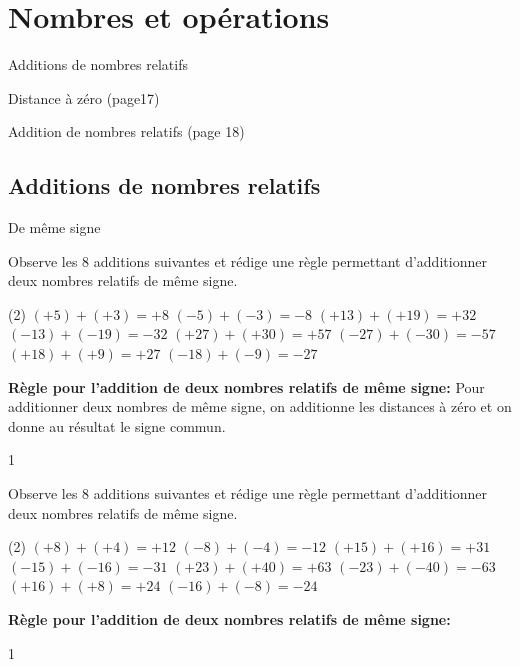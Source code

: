 \documentclass[a4paper,11pt]{report}
\begin{document}
\newcommand{\chapterName}{Nombres et opérations}
\newcommand{\serieName}{Additions de nombres relatifs}

\chapter*{\chapterName}
\thispagestyle{empty}

\begin{amL}{\serieName}{
\item Distance à zéro (page17)
\item Addition de nombres relatifs (page 18)
}\end{amL}

\section*{\serieName}
\setcounter{page}{1}



\begin{resolu}
{De même signe}{Observe les 8 additions suivantes et rédige une règle permettant d'additionner deux nombres relatifs de même signe.
\begin{tasks}(2)
\task $(+5)+(+3)= +8$
\task $(-5)+(-3)= -8$
\task $(+13)+(+19)= +32$
\task $(-13)+(-19)= -32$
\task $(+27)+(+30)= +57$
\task $(-27)+(-30)= -57$
\task $(+18)+(+9)= +27$
\task $(-18)+(-9)= -27$
\end{tasks}

{\bf Règle pour l'addition de deux nombres relatifs de même signe:} Pour additionner deux nombres de même signe, on additionne les distances à zéro et on donne au résultat le signe commun.
}{1}
\end{resolu}

\begin{exop}
{Observe les 8 additions suivantes et rédige une règle permettant d'additionner deux nombres relatifs de même signe.
\begin{tasks}(2)
\task $(+8)+(+4)= +12$
\task $(-8)+(-4)= -12$
\task $(+15)+(+16)= +31$
\task $(-15)+(-16)= -31$
\task $(+23)+(+40)= +63$
\task $(-23)+(-40)= -63$
\task $(+16)+(+8)= +24$
\task $(-16)+(-8)= -24$
\end{tasks}

{\bf Règle pour l'addition de deux nombres relatifs de même signe:} 

\hrulefill

\hrulefill

}{1}
\end{exop}
\end{document}
